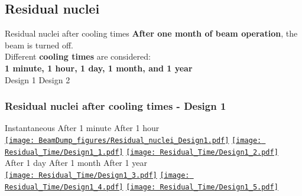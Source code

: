 \documentclass[xcolor={dvipsnames}]{beamer}
\begin{document}
\subsection{Residual nuclei}
\begin{frame}{Residual nuclei after cooling times}
\textbf{After one month of beam operation}, the beam is turned off.\\
Different \textbf{cooling times} are considered:\\
\textbf{1 minute, 1 hour, 1 day, 1 month, and 1 year}\\
\vspace*{0.3cm}
\hspace*{1.8cm} Design 1 \hfill Design 2 \hspace*{2.3cm} \\
  \begin{center}
  \end{center}
\end{frame}
\begin{frame}
  \frametitle{Residual nuclei after cooling times - \textbf{Design 1}}
  \hypertarget{residualtimesprev_Design1}{}
  \begin{center}
    \hspace*{1cm} Instantaneous \hfill After 1 minute \hfill After 1 hour \hspace*{1.2cm} \\
  \hyperlink{Residual_nuclei_Design1}{\texttt{[image: BeamDump\_figures/Residual\_nuclei\_Design1.pdf]}}
  \hyperlink{Residual_nuclei_minute_Design1}{\texttt{[image: Residual\_Time/Design1\_1.pdf]}}
  \hyperlink{Residual_nuclei_hour_Design1}{\texttt{[image: Residual\_Time/Design1\_2.pdf]}}\\
    \hspace*{1cm} After 1 day \hfill After 1 month \hfill After 1 year\hspace*{1.4cm} \\
  \hyperlink{Residual_nuclei_day_Design1}{\texttt{[image: Residual\_Time/Design1\_3.pdf]}}
  \hyperlink{Residual_nuclei_month_Design1}{\texttt{[image: Residual\_Time/Design1\_4.pdf]}}
  \hyperlink{Residual_nuclei_year_Design1}{\texttt{[image: Residual\_Time/Design1\_5.pdf]}}
 \end{center}
\end{frame}
\end{document}
